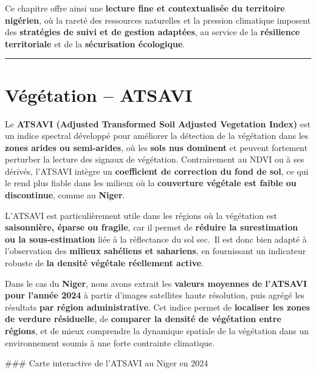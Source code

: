\documentclass[
]{book}
\begin{document}
Ce chapitre offre ainsi une \textbf{lecture fine et contextualisée du territoire nigérien}, où la rareté des ressources naturelles et la pression climatique imposent des \textbf{stratégies de suivi et de gestion adaptées}, au service de la \textbf{résilience territoriale} et de la \textbf{sécurisation écologique}.

\begin{center}\rule{0.5\linewidth}{0.5pt}\end{center}

\section{Végétation -- ATSAVI}\label{vuxe9guxe9tation-atsavi}

Le \textbf{ATSAVI (Adjusted Transformed Soil Adjusted Vegetation Index)} est un indice spectral développé pour améliorer la détection de la végétation dans les \textbf{zones arides ou semi-arides}, où les \textbf{sols nus dominent} et peuvent fortement perturber la lecture des signaux de végétation. Contrairement au NDVI ou à ses dérivés, l'ATSAVI intègre un \textbf{coefficient de correction du fond de sol}, ce qui le rend plus fiable dans les milieux où la \textbf{couverture végétale est faible ou discontinue}, comme au \textbf{Niger}.

L'ATSAVI est particulièrement utile dans les régions où la végétation est \textbf{saisonnière, éparse ou fragile}, car il permet de \textbf{réduire la surestimation ou la sous-estimation} liée à la réflectance du sol sec.~Il est donc bien adapté à l'observation des \textbf{milieux sahéliens et sahariens}, en fournissant un indicateur robuste de \textbf{la densité végétale réellement active}.

Dans le cas du \textbf{Niger}, nous avons extrait les \textbf{valeurs moyennes de l'ATSAVI pour l'année 2024} à partir d'images satellites haute résolution, puis agrégé les résultats \textbf{par région administrative}. Cet indice permet de \textbf{localiser les zones de verdure résiduelle}, de \textbf{comparer la densité de végétation entre régions}, et de mieux comprendre la dynamique spatiale de la végétation dans un environnement soumis à une forte contrainte climatique.

\#\#\#️ Carte interactive de l'ATSAVI au Niger en 2024
\end{document}
